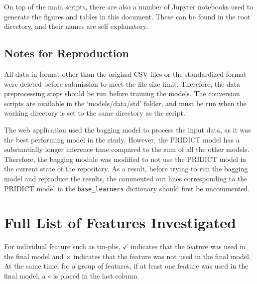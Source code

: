 On top of the main scripts, there are also a number of Jupyter notebooks used to generate the figures and tables in this document. These can be found in the root directory, and their names are self explanatory.

\section{Notes for Reproduction}

All data in format other than the original CSV files or the standardized format were deleted before submission to meet the file size limit. Therefore, the data preprocessing steps should be run before training the models. The conversion scripts are available in the `models/data/std' folder, and must be run when the working directory is set to the same directory as the script.

The web application used the bagging model to process the input data, as it was the best performing model in the study. However, the PRIDICT model has a substantially longer inference time compared to the sum of all the other models. Therefore, the bagging module was modified to not use the PRIDICT model in the current state of the repository. As a result, before trying to run the bagging model and reproduce the results, the commented out lines corresponding to the PRIDICT model in the \verb|base_learners| dictionary should first be uncommented.


\chapter{Full List of Features Investigated}
\label{appendix:features}

For individual feature such as tm-pbs, $\checkmark$ indicates that the feature was used in the final model and $\times$ indicates that the feature was not used in the final model. At the same time, for a group of features, if at least one feature was used in the final model, a $\circ$ is placed in the last column. 

